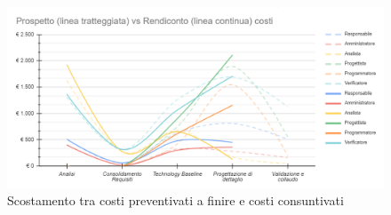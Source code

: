 \documentclass[../piano_di_progetto.tex]{subfiles}
\begin{document}
		


\begin{figure}[H]
	\centering
	\includegraphics[width=17cm]{src/img/report/prospetto_costi_totale}
	\caption{Scostamento tra costi preventivati a finire e costi consuntivati}
\end{figure}


\end{document}
